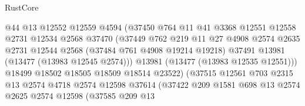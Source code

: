 \begin{lexlean}{RustCore}
\begin{coremodule}
                                  @44
                                  @13
                                  @12552
                                  @12559
                                  @4594
                                  (@37450
                                    @764
                                    @11
                                    @41
                                    @3368
                                    @12551
                                    @12558
                                    @2731
                                    @12534
                                    @2568
                                    @37470
                                    (@37449
                                      @762
                                      @219
                                      @11
                                      @27
                                      @4908
                                      @2574
                                      @2635
                                      @2731
                                      @12544
                                      @2568
                                      (@37484 @761 @4908 @19214 @19218)
                                      @37491
                                      @13981
                                      (@13477 (@13983 @12545 @2574)))
                                    @13981
                                    (@13477 (@13983 @12535 @12551)))
                                  @18499
                                  @18502
                                  @18505
                                  @18509
                                  @18514
                                  @23522)
                                (@37515
                                  @12561
                                  @703
                                  @2315
                                  @13
                                  @2574
                                  @4718
                                  @2574
                                  @12598
                                  @37614
                                  (@37422
                                    @209
                                    @1581
                                    @698
                                    @13
                                    @2574
                                    @2625
                                    @2574
                                    @12598
                                    (@37585
                                      @209
                                      @13

\end{coremodule}
\end{lexlean}
